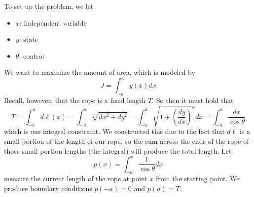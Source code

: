 \documentclass{article}
\begin{document}
\noindent
To set up the problem, we let
\begin{itemize}
    \item $x$: independent variable
    \item $y$: state
    \item $\theta$: control
\end{itemize}
We want to maximize the amount of area, which is modeled by
\[J = \int_{-a}^{a}y(x)dx\]
Recall, however, that the rope is a fixed length $T$. So then it must hold that
\[T = \int_{-a}^{a}d\ell(x) = \int_{-a}^{a}\sqrt{dx^2+dy^2} =
\int_{-a}^{a}\sqrt{1+\left(\frac{dy}{dx}\right)^2}dx = \int_{-a}^{a}\frac{dx}{\cos\theta}\]
which is our integral constraint. We constructed this due to the fact that $d\ell$ is
a small portion of the length of our rope, so the sum across the ends of the rope of those
small portion lengths (the integral) will produce the total length. Let
\[p(x) = \int_{-a}^{x}\frac{1}{\cos\theta}dx\]
measure the current length of the rope at point $x$ from the starting point. We produce
boundary conditions $p(-a) = 0$ and $p(a) = T$.
\end{document}
